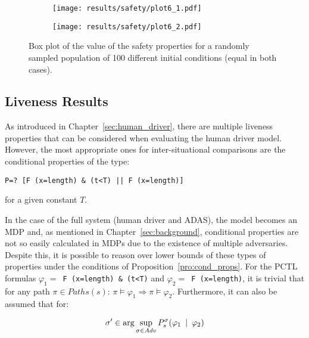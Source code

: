 \begin{figure}[H]
\centering
\begin{subfigure}{0.49\textwidth}
  \centering
  \texttt{[image: results/safety/plot6\_1.pdf]}
\end{subfigure}
\begin{subfigure}{0.49\textwidth}
  \centering
  \texttt{[image: results/safety/plot6\_2.pdf]}
\end{subfigure} 
\caption{Box plot of the value of the safety properties for a randomly sampled population of 100 different initial conditions (equal in both cases).}
\label{fig:plot6}
\end{figure}

\subsection{Liveness Results}
\label{sec:res_liveness}

As introduced in Chapter~\ref{sec:human_driver}, there are multiple liveness properties that can be considered when evaluating the human driver model. However, the most appropriate ones for inter-situational comparisons are the conditional properties of the type:

\begin{minipage}{\linewidth}
{\vspace{1em}
\begin{lstlisting}
P=? [F (x=length) & (t<T) || F (x=length)]
\end{lstlisting}
}
\end{minipage}

for a given constant $T$.

In the case of the full system (human driver and ADAS), the model becomes an MDP and, as mentioned in Chapter~\ref{sec:background}, conditional properties are not so easily calculated in MDPs due to the existence of multiple adversaries. Despite this, it is possible to reason over lower bounds of these types of properties under the conditions of Proposition~\ref{pro:cond_props}. For the PCTL formulas $\varphi_1 = $\texttt{ F (x=length) \& (t<T)} and $\varphi_2 = $\texttt{ F (x=length)}, it is trivial that for any path $\pi \in Paths(s)$: $\pi \models \varphi_1 \Rightarrow \pi \models \varphi_2$. Furthermore, it can also be assumed that for:

\begin{equation}
	\sigma' \in \arg\sup_{\sigma \in Adv} P^{\sigma}_s (\varphi_1 \:\mid\: \varphi_2)
\end{equation}

